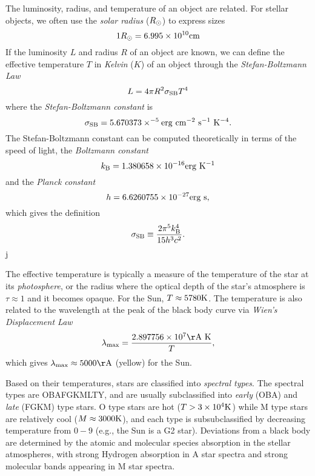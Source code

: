 \documentclass[]{article}
\begin{document}
The luminosity, radius, and temperature of an object are related. For stellar
objects, we often use the {\it solar radius} ($R_{\odot}$) to express sizes
\begin{equation}
1R_{\odot} = 6.995 \times 10^{10} \mathrm{cm}
\end{equation}
\noindent
If the luminosity $L$ and radius $R$ of an object are known, we can define
the effective temperature $T$ in {\it Kelvin} ($K$)
of an object through the {\it Stefan-Boltzmann Law}
\begin{equation}
L = 4\pi R^{2}\sigma_{\mathrm{SB}} T^{4}
\end{equation}
\noindent
where the {\it Stefan-Boltzmann constant} is
\begin{equation}
\sigma_{\mathrm{SB}} = 5.670373\times^{-5} \mathrm{erg}~\mathrm{cm}^{-2}~\mathrm{s}^{-1}~\mathrm{K}^{-4}.
\end{equation}
The Stefan-Boltzmann constant can be computed theoretically in
terms of the speed of light, the {\it Boltzmann constant}
\begin{equation}
k_{\mathrm{B}} = 1.380658\times10^{-16} \mathrm{erg}~\mathrm{K}^{-1}
\end{equation}
\noindent
and the {\it Planck constant}
\begin{equation}
h = 6.6260755\times10^{-27}\mathrm{erg}~\mathrm{s},
\end{equation}
\noindent
which gives the definition
\begin{equation}
\sigma_{\mathrm{SB}} \equiv \frac{2\pi^5 k_{\mathrm{B}}^4}{15 h^3 c^2}.
\end{equation}j

The effective temperature is typically a measure of the temperature
of the star at its {\it photosphere}, or the radius where the optical
depth of the star's atmosphere is $\tau\approx1$ and it becomes opaque. 
For the Sun,
$T\approx5780\mathrm{K}$. The temperature is also related to the wavelength
at the peak of the black body curve via {\it Wien's Displacement Law}
\begin{equation}
\lambda_{\mathrm{max}} = \frac{2.897756\times10^{7} \Ang~\K}{T},
\end{equation}
which gives $\lambda_{\mathrm{max}}\approx5000\Ang$ (yellow)
for the Sun.

Based on their temperatures, stars are classified into {\it spectral types}.
The spectral types are OBAFGKMLTY, and are usually subclassified into {\it early}
(OBA) and {\it late} (FGKM) type stars. O type stars are hot ($T>3\times10^4\mathrm{K}$) while
M type stars are relatively cool ($M\approx3000\mathrm{K}$), and each type is
subsubclassified by decreasing temperature
from $0-9$ (e.g., the Sun is a G2 star). Deviations from a black body are
determined by the atomic and molecular species absorption in the stellar atmospheres,
with strong Hydrogen absorption in A star spectra and strong molecular bands appearing
in M star spectra.
\end{document}
